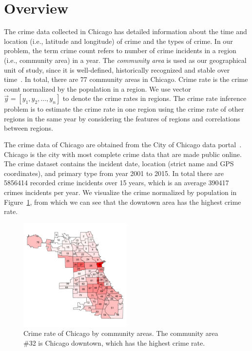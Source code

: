 
\section{Overview}
\label{sec:overview}
The crime data collected in Chicago has detailed information about the time and location (i.e., latitude and longitude) of crime and the types of crime. In our problem, the term crime count refers to number of crime incidents in a region (i.e., community area) in a year. The \emph{community area} is used as our geographical unit of study, since it is well-defined,  historically recognized and stable over time~\cite{wiki-ca}. In total, there are 77 community areas in Chicago.  Crime rate is the crime count normalized by the population in a region. We use vector $\vec{y} = [y_1, y_2, \ldots, y_n]$ to denote the crime rates in regions. The crime rate inference problem is to estimate the crime rate in one region using the crime rate of other regions in the same year by considering the features of regions and correlations between regions. 


The crime data of Chicago are obtained from the City of Chicago data portal~\cite{crime-data}. Chicago is the city with most complete crime data that are made public online. The crime dataset contains the incident date, location (strict name and GPS coordinates), and primary type from year 2001 to 2015. In total there are \num{5856414} recorded crime incidents over 15 years, which is an average \num{390417} crimes incidents per year. We visualize the crime normalized by population in Figure~\ref{fig:crime-ca}, from which we can see that the downtown area has the highest crime rate.

\begin{figure}[t]
\centering
\includegraphics[width=0.5\textwidth]{fig/crime-ca.pdf}
\caption{Crime rate of Chicago by community areas. The community area \#32 is Chicago downtown, which has the highest crime rate.}
\label{fig:crime-ca}
\end{figure}


